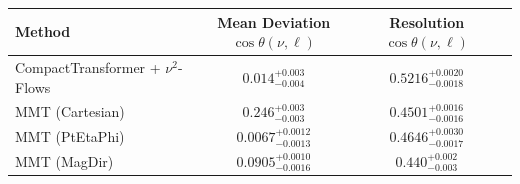     \begin{tabular}{lccc}
        \toprule
        Method & Mean Deviation $\cos\theta(\nu, \ell)$ & Resolution $\cos\theta(\nu, \ell)$ \\
        \midrule
        CompactTransformer + $\nu^2$-Flows & $0.014^{+0.003}_{-0.004}$ & $0.5216^{+0.0020}_{-0.0018}$ \\
        MMT (Cartesian) & $0.246^{+0.003}_{-0.003}$ & $0.4501^{+0.0016}_{-0.0016}$ \\
        MMT (PtEtaPhi) & $0.0067^{+0.0012}_{-0.0013}$ & $0.4646^{+0.0030}_{-0.0017}$ \\
        MMT (MagDir) & $0.0905^{+0.0010}_{-0.0016}$ & $0.440^{+0.002}_{-0.003}$ \\
        \bottomrule
    \end{tabular}